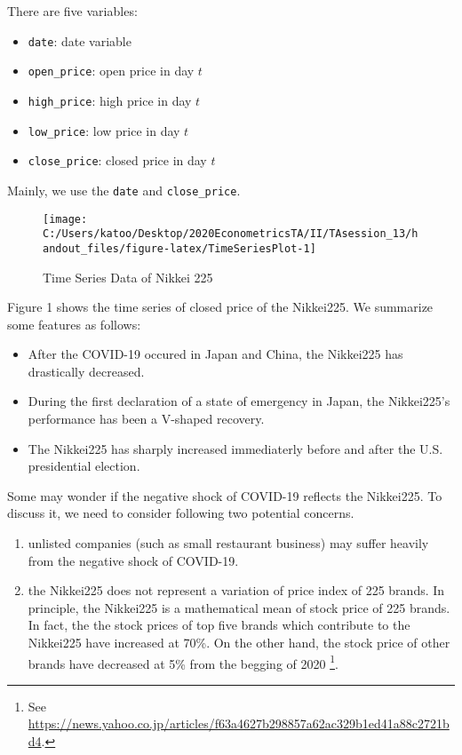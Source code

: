 \documentclass[
  12pt,
]{article}
\providecommand{\tightlist}{%
  \setlength{\itemsep}{0pt}\setlength{\parskip}{0pt}}
\begin{document}
There are five variables:

\begin{itemize}
\tightlist
\item
  \texttt{date}: date variable
\item
  \texttt{open\_price}: open price in day \(t\)
\item
  \texttt{high\_price}: high price in day \(t\)
\item
  \texttt{low\_price}: low price in day \(t\)
\item
  \texttt{close\_price}: closed price in day \(t\)
\end{itemize}

Mainly, we use the \texttt{date} and \texttt{close\_price}.

\begin{figure}[h]

{\centering \texttt{[image: C:/Users/katoo/Desktop/2020EconometricsTA/II/TAsession\_13/handout\_files/figure-latex/TimeSeriesPlot-1]} 

}

\caption{Time Series Data of Nikkei 225}\label{fig:TimeSeriesPlot}
\end{figure}

Figure 1 shows the time series of closed price of the Nikkei225. We
summarize some features as follows:

\begin{itemize}
\tightlist
\item
  After the COVID-19 occured in Japan and China, the Nikkei225 has
  drastically decreased.
\item
  During the first declaration of a state of emergency in Japan, the
  Nikkei225's performance has been a V-shaped recovery.
\item
  The Nikkei225 has sharply increased immediaterly before and after the
  U.S. presidential election.
\end{itemize}

Some may wonder if the negative shock of COVID-19 reflects the
Nikkei225. To discuss it, we need to consider following two potential
concerns.

\begin{enumerate}
\def\labelenumi{\arabic{enumi}.}
\tightlist
\item
  unlisted companies (such as small restaurant business) may suffer
  heavily from the negative shock of COVID-19.
\item
  the Nikkei225 does not represent a variation of price index of 225
  brands. In principle, the Nikkei225 is a mathematical mean of stock
  price of 225 brands. In fact, the the stock prices of top five brands
  which contribute to the Nikkei225 have increased at 70\%. On the other
  hand, the stock price of other brands have decreased at 5\% from the
  begging of 2020 \footnote{See
    \url{https://news.yahoo.co.jp/articles/f63a4627b298857a62ac329b1ed41a88c2721bd4}.}.
\end{enumerate}
\end{document}
